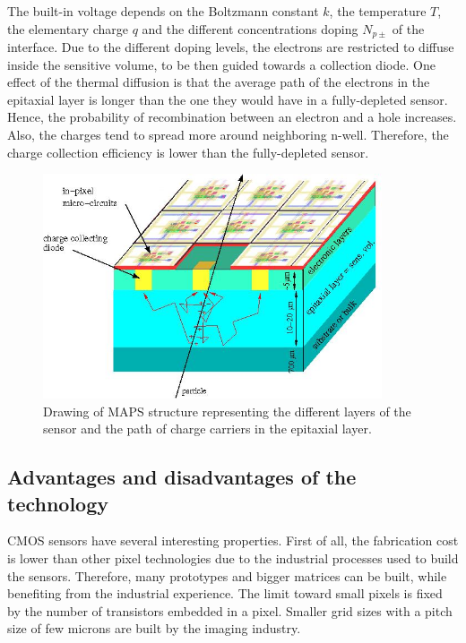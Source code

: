     The built-in voltage depends on the Boltzmann constant $k$, the temperature $T$, the elementary charge $q$ and the different concentrations doping $N_{p\pm}$ of the interface.
    Due to the different doping levels, the electrons are restricted to diffuse inside the sensitive volume, to be then guided towards a collection diode.
    One effect of the thermal diffusion is that the average path of the electrons in the epitaxial layer is longer than the one they would have in a fully-depleted sensor.
    Hence, the probability of recombination between an electron and a hole increases.
    Also, the charges tend to spread more around neighboring n-well.
    Therefore, the charge collection efficiency is lower than the fully-depleted sensor.

    \begin{figure}[!tbh]
      \centering
      \includegraphics[width = 10cm]{Pictures/vxd/principeMapsMIP.jpg}
      \caption{Drawing of MAPS structure representing the different layers of the sensor and the path of charge carriers in the epitaxial layer.}
      \label{fig:principleMaps}
    \end{figure}

    \subsection{Advantages and disadvantages of the technology}

    \gls{CMOS} sensors have several interesting properties.
    First of all, the fabrication cost is lower than other pixel technologies due to the industrial processes used to build the sensors.
    Therefore, many prototypes and bigger matrices can be built, while benefiting from the industrial experience.
    The limit toward small pixels is fixed by the number of transistors embedded in a pixel.
    Smaller grid sizes with a pitch size of few microns are built by the imaging industry.
    

